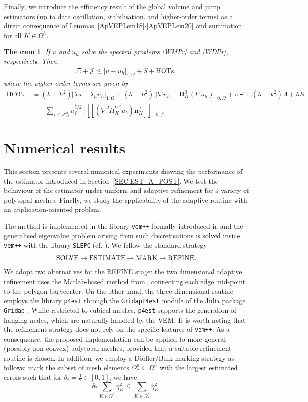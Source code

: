 \documentclass[final,reqno]{elsarticle}
\newtheorem{theorem}{Theorem}[section]
\newcommand\cJ{\mathcal{J}}
\def\bPi{\mathbf{\Pi}}
\begin{document}
Finally, we introduce the efficiency result of the global volume and jump estimators (up to data oscillation, stabilisation, and higher-order terms) as a direct consequence of Lemmas~\ref{ApVEPLem18}-\ref{ApVEPLem20} and summation for all $K\in\Omega^h$.
\begin{theorem}\label{th:efficiency}
	If  $u$ and $u_h$ solve the spectral problems \eqref{WMPr} and \eqref{WDPr}, respectively. Then, 
	\begin{align*}
		\Xi + \cJ \lesssim |u-u_h|_{2,\Omega} + S + \mathrm{HOTs},
	\end{align*}
    where the higher-order terms are given by 
    \begin{align}
    \mathrm{HOTs} &:= (h+h^2)|\lambda u-\lambda_h u_h|_{1,\Omega} +  (h+h^2)||\nabla u_h - \bPi_K^0 (\nabla u_h)||_{0,\Omega} + h\Xi + (h+h^2)\Lambda + hS \nonumber\\
    &\quad  + \sum_{f\in\mathcal{F}^h_\Omega}h_f^{5/2}||[\![(\nabla^2\Pi_K^{\nabla^2} u_h )\boldsymbol{n}_K^{f}]\!]||_{0,f}. \nonumber
    \end{align}
\end{theorem}

\section{Numerical results}\label{sec:numerical_examples}
This section presents several numerical experiments showing the performance of the estimator introduced in Section~\ref{SEC:EST_A_POST}. We test the behaviour of the estimator under uniform and adaptive refinement for a variety of polytopal meshes.
Finally, we study the applicability of the adaptive routine with an application-oriented problem.

The method is implemented in the library \texttt{vem++} formally introduced in  \cite{dassi2025vem++} and the generalised eigenvalue problem arising from such discretisations is solved inside \texttt{vem++} with the library \texttt{SLEPC} (cf. \cite{slepc}). We follow the standard strategy
$$\textnormal{SOLVE} \rightarrow \textnormal{ESTIMATE} \rightarrow \textnormal{MARK} \rightarrow \textnormal{REFINE}.$$
We adopt two alternatives for the REFINE stage: the two dimensional adaptive refinement uses the Matlab-based method from \cite{yu2021implementationpolygonalmeshrefinement}, connecting each edge mid-point to the polygon barycenter. On the other hand, the three dimensional routine employs the library \texttt{p4est} \cite{p4est} through the \texttt{GridapP4est} module of the Julia package \texttt{Gridap} \cite{gridap}. While restricted to cubical meshes, \texttt{p4est} supports the generation of hanging nodes, which are naturally handled by the VEM. It is worth noting that the refinement strategy does not rely on the specific features of \texttt{vem++}. As a consequence, the proposed implementation can be applied to more general (possibly non-convex) polytopal meshes, provided that a suitable refinement routine is chosen. In addition, we employ a D\"orfler/Bulk marking strategy as follows: mark the subset of mesh elements $\Omega^h_* \subseteq \Omega^h$ with the largest estimated errors such that for $\delta_* = \frac{1}{2}\in [0,1]$, we have
$$\delta_* \sum_{K\in \Omega^h} \eta_K^2 \leq \sum_{K\in \Omega^h_*} \eta_K^2.$$ 
\end{document}
